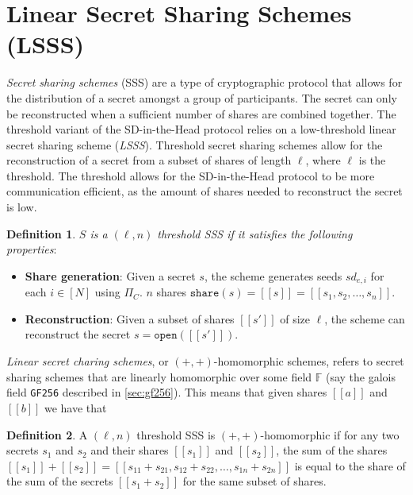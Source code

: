 \documentclass[twoside,11pt]{report}
\theoremstyle{definition}
\newtheorem{definition}{Definition}[section]
\theoremstyle{plain}
\begin{document}
\section{Linear Secret Sharing Schemes (LSSS)}\label{sec:lsss}

\textit{Secret sharing schemes} (SSS) are a type of cryptographic protocol that allows for the distribution of a secret amongst a group of participants. The secret can only be reconstructed when a sufficient number of shares are combined together. The threshold variant of the SD-in-the-Head protocol relies on a low-threshold linear secret sharing scheme (\textit{LSSS}). Threshold secret sharing schemes allow for the reconstruction of a secret from a subset of shares of length $\ell$, where $\ell$ is the threshold. The threshold allows for the SD-in-the-Head protocol to be more communication efficient, as the amount of shares needed to reconstruct the secret is low.

\begin{definition}\label{def:sss}
  \textit{$S$ is a $(\ell,n)$ threshold SSS if it satisfies the following properties}:

  \begin{itemize}
    \item \textbf{Share generation}: Given a secret $s$, the scheme generates seeds $sd_{e,i}$ for each $i \in [N]$ using $\Pi_C$. $n$ shares $\texttt{share}(s) = [[s]] = [[s_1, s_2, \dots, s_n]]$.
    \item \textbf{Reconstruction}: Given a subset of shares $[[s']]$ of size $\ell$, the scheme can reconstruct the secret $s = \texttt{open}([[s']])$.
  \end{itemize}

\end{definition}

\textit{Linear secret charing schemes}, or $(+,+)$-homomorphic schemes, refers to secret sharing schemes that are linearly homomorphic over some field $\mathbb{F}$ (say the galois field \texttt{GF256} described in \autoref{sec:gf256}). This means that given shares $[[a]]$ and $[[b]]$ we have that
\begin{definition}
  A $(\ell,n)$ threshold SSS is $(+,+)$-homomorphic if for any two secrets $s_1$ and $s_2$ and their shares $[[s_1]]$ and $[[s_2]]$, the sum of the shares $[[s_1]] + [[s_2]] = [[s_{11} + s_{21}, s_{12} + s_{22}, \dots, s_{1n} + s_{2n}]]$ is equal to the share of the sum of the secrets $[[s_1 + s_2]]$ for the same subset of shares.
\end{definition}
\end{document}

